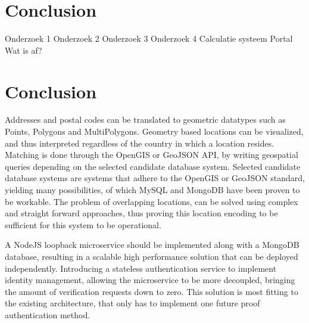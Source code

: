 \graphicspath{{Chapter7/Figs/Vector/}{Chapter7/Figs/}}

%
\chapter{Conclusion}

Onderzoek 1
Onderzoek 2
Onderzoek 3
Onderzoek 4
Calculatie systeem
Portal
Wat is af?

%
\chapter{Conclusion}


Addresses and postal codes can be translated to geometric datatypes such as Points, Polygons and MultiPolygons. Geometry based locations can be visualized, and thus interpreted regardless of the country in which a location resides. Matching is done through the OpenGIS or GeoJSON API, by writing geospatial queries depending on the selected candidate database system. Selected candidate database systems are systems that adhere to the OpenGIS or GeoJSON standard, yielding many possibilities, of which MySQL and MongoDB have been proven to be workable. The problem of overlapping locations, can be solved using complex and straight forward approaches, thus proving this location encoding to be sufficient for this system to be operational.

A NodeJS loopback microservice should be implemented along with a MongoDB database, resulting in a scalable high performance solution that can be deployed independently. Introducing a stateless authentication service to implement identity management, allowing the microservice to be more decoupled, bringing the amount of verification requests down to zero. This solution is most fitting to the existing architecture, that only has to implement one future proof authentication method.


